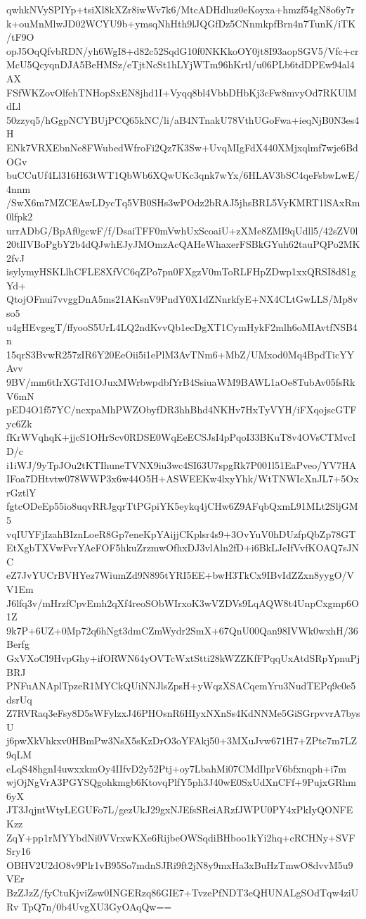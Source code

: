 qwhkNVySPIYp+tsiXl8kXZr8iwWv7k6/MtcADHdluz0eKoyxa+hmzf54gN8o6y7r
k+ouMnMlwJD02WCYU9b+ymsqNhHth9lJQGfDz5CNnmkpfBrn4n7TunK/iTK/tF9O
opJ5OqQfvbRDN/yh6WgI8+d82c52SqdG10f0NKKkoOY0jt8I93aopSGV5/Vfc+cr
McU5QcyqnDJA5BeHMSz/eTjtNcSt1hLYjWTm96hKrtl/u06PLb6tdDPEw94al4AX
FSfWKZovOlfehTNHopSxEN8jhd1I+Vyqq8bl4VbbDHbKj3cFw8mvyOd7RKUlMdLl
50zzyq5/hGgpNCYBUjPCQ65kNC/li/aB4NTnakU78VthUGoFwa+ieqNjB0N3es4H
ENk7VRXEbnNe8FWubedWfroFi2Qz7K3Sw+UvqMIgFdX440XMjxqlmf7wje6BdOGv
buCCuUf4Ll316H63tWT1QbWb6XQwUKc3qnk7wYx/6HLAV3bSC4qeFsbwLwE/4nnm
/SwX6m7MZCEAwLDycTq5VB0SHs3wPOdz2bRAJ5jhsBRL5VyKMRT1lSAxRm0lfpk2
urrADbG/BpAf0gcwF/f/DsaiTFF0mVwhUxScoaiU+zXMe8ZMI9qUdll5/42sZV0l
20tlIVBoPgbY2b4dQJwhEJyJMOmzAcQAHeWhaxerFSBkGYuh62tauPQPo2MK2fvJ
isylymyHSKLlhCFLE8XfVC6qZPo7pn0FXgzV0mToRLFHpZDwp1xxQRSI8d81gYd+
QtojOFnui7vvggDnA5ms21AKsnV9PndY0X1dZNnrkfyE+NX4CLtGwLLS/Mp8vso5
u4gHEvgegT/ffyooS5UrL4LQ2ndKvvQb1ecDgXT1CymHykF2mlh6oMIAvtfNSB4n
15qrS3BvwR257zIR6Y20EeOii5i1ePlM3AvTNm6+MbZ/UMxod0Mq4BpdTicYYAvv
9BV/mm6tIrXGTd1OJuxMWrbwpdbfYrB4SsiuaWM9BAWL1aOe8TubAv05fsRkV6mN
pED4O1f57YC/ncxpaMhPWZObyfDR3hhBhd4NKHv7HxTyVYH/iFXqojscGTFyc6Zk
fKrWVqhqK+jjcS1OHrScv0RDSE0WqEeECSJsI4pPqoI33BKuT8v4OVsCTMvcID/c
i1iWJ/9yTpJOu2tKTIhuneTVNX9iu3wc4SI63U7spgRk7P001l51EaPveo/YV7HA
IFoa7DHtvtw078WWP3x6w44O5H+ASWEEKw4lxyYhk/WtTNWIcXnJL7+5OxrGztlY
fgtcODeEp55io8uqvRRJgqrTtPGpiYK5eykq4jCHw6Z9AFqbQxmL91MLt2SljGM5
vqIUYFjIzahBIznLoeR8Gp7eneKpYAijjCKplsr4s9+3OvYuV0hDUzfpQbZp78GT
EtXgbTXVwFvrYAeFOF5hkuZrzmwOfhxDJ3vlAln2fD+i6BkLJeIfVvfKOAQ7sJNC
eZ7JvYUCrBVHYez7WiumZd9N895tYRI5EE+bwH3TkCx9IBvIdZZxn8yygO/VV1Em
J6lfq3v/mHrzfCpvEmh2qXf4reoSObWIrxoK3wVZDVs9LqAQW8t4UnpCxgmp6O1Z
9k7P+6UZ+0Mp72q6hNgt3dmCZmWydr2SmX+67QnU00Qan98IVWk0wxhH/36Berfg
GxVXoCl9HvpGhy+ifORWN64yOVTcWxtStti28kWZZKfFPqqUxAtdSRpYpnuPjBRJ
PNFuANAplTpzeR1MYCkQUiNNJlsZpsH+yWqzXSACqemYru3NudTEPq9c0e5dsrUq
Z7RVRaq3eFsy8D5sWFylzxJ46PHOsnR6HIyxNXnSs4KdNNMe5GiSGrpvvrA7bysU
j6pwXkVhkxv0HBmPw3NsX5sKzDrO3oYFAkj50+3MXuJvw671H7+ZPtc7m7LZ9qLM
eLqS48hgnI4uwxxkmOy4IIfvD2y52Ptj+oy7LbahMi07CMdIlprV6bfxnqph+i7m
wjOjNgVrA3PGYSQgohkmgb6KtovqPlfY5ph3J40wE0SxUdXnCFf+9PujxGRhm6yX
JT3JqjntWtyLEGUFo7L/gezUkJ29gxNJEfsSReiARzfJWPU0PY4xPkIyQONFEKzz
ZqY+pp1rMYYbdNi0VVrxwKXe6RijbeOWSqdiBHboo1kYi2hq+cRCHNy+SVFSry16
OBHV2U2dO8v9Plr1vB95So7mdnSJRi9ft2jN8y9mxHa3xBuHzTmwO8dvvM5u9VEr
BzZJzZ/fyCtuKjviZsw0INGERzq86GIE7+TvzePfNDT3eQHUNALgSOdTqw4ziURv
TpQ7n/0b4UvgXU3GyOAqQw==

